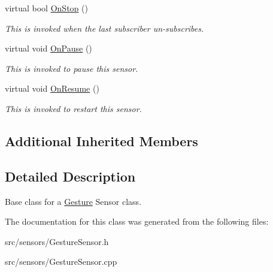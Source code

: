 \begin{DoxyCompactItemize}
\mbox{\label{class_gesture_sensor_ab7db8e69526a7e98d3feb8889759b2ca}} 
virtual bool \hyperlink{class_gesture_sensor_ab7db8e69526a7e98d3feb8889759b2ca}{On\+Stop} ()
\begin{DoxyCompactList}\small\item\em This is invoked when the last subscriber un-\/subscribes. \end{DoxyCompactList}\item 
\mbox{\label{class_gesture_sensor_adda207e7d5e86f79dbbfceede21f7c91}} 
virtual void \hyperlink{class_gesture_sensor_adda207e7d5e86f79dbbfceede21f7c91}{On\+Pause} ()
\begin{DoxyCompactList}\small\item\em This is invoked to pause this sensor. \end{DoxyCompactList}\item 
\mbox{\label{class_gesture_sensor_af9ebfec9b18d1eab71d06f8f0f62e9ed}} 
virtual void \hyperlink{class_gesture_sensor_af9ebfec9b18d1eab71d06f8f0f62e9ed}{On\+Resume} ()
\begin{DoxyCompactList}\small\item\em This is invoked to restart this sensor. \end{DoxyCompactList}\end{DoxyCompactItemize}
\subsection*{Additional Inherited Members}


\subsection{Detailed Description}
Base class for a \hyperlink{class_gesture}{Gesture} Sensor class. 

The documentation for this class was generated from the following files\+:\begin{DoxyCompactItemize}
\item 
src/sensors/Gesture\+Sensor.\+h\item 
src/sensors/Gesture\+Sensor.\+cpp\end{DoxyCompactItemize}
